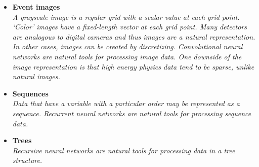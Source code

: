 \documentclass[12pt,letterpaper]{article}
\begin{document}
\begin{itemize}
\begin{itemize}
\begin{itemize}
				\item \textbf{Event images}~\cite{IceCube:2025swy,IceCube:2025jmv,Wu:2025jza,Andriamirado:2025fht,Murali:2024xnf,He:2024ppu,Ban:2023jfo,Yang:2023djv,Bae:2022dnw,Pol:2021iqw,Andrews:2021ejw,Du:2019civ,Chung:2020ysf,Andrews:2018nwy,Lin:2018cin,ATL-PHYS-PUB-2019-028,Nguyen:2018ugw}
				\\\textit{A grayscale image is a regular grid with a scalar value at each grid point.  `Color' images have a fixed-length vector at each grid point.  Many detectors are analogous to digital cameras and thus images are a natural representation.  In other cases, images can be created by discretizing.   Convolutional neural networks are natural tools for processing image data.  One downside of the image representation is that high energy physics data tend to be sparse, unlike natural images.}
				\item \textbf{Sequences}~\cite{ATL-PHYS-PUB-2017-003,deLima:2021fwm,goto2021development,Bols:2020bkb,Nguyen:2018ugw,Guest:2016iqz}
				\\\textit{Data that have a variable with a particular order may be represented as a sequence.  Recurrent neural networks are natural tools for processing sequence data. }
				\item \textbf{Trees}~\cite{Frid:2025mpg,Choudhury:2024crp,Matousek:2024vpa,Finke:2023ltw,Belfkir:2023vpo,Dutta:2023jbz,Jercic:2021bfc,Cheng:2017rdo,Louppe:2017ipp}
				\\\textit{Recursive neural networks are natural tools for processing data in a tree structure.}

\end{itemize}
\end{itemize}
\end{itemize}
\end{document}
